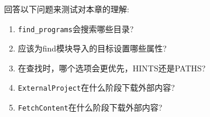 回答以下问题来测试对本章的理解:

\begin{enumerate}
\item 
\texttt{find\_programs}会搜索哪些目录?

\item 
应该为find模块导入的目标设置哪些属性?

\item 
在查找时，哪个选项会更优先，HINTS还是PATHS?

\item 
\texttt{ExternalProject}在什么阶段下载外部内容?

\item 
\texttt{FetchContent}在什么阶段下载外部内容?
\end{enumerate}